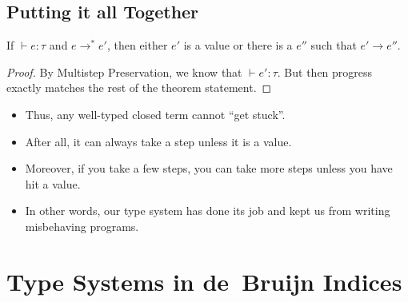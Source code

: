 \documentclass{lecturenotes}
\begin{document}
\subsection{Putting it all Together}
\label{sec:putting-it-all}

\begin{thm}
  If $\vdash e \colon \tau$ and $e \to^\ast e'$, then either $e'$ is a value or there is a $e''$ such that $e' \to e''$.
\end{thm}
\begin{proof}
  By Multistep Preservation, we know that $\vdash e' : \tau$.
  But then progress exactly matches the rest of the theorem statement.
\end{proof}

\begin{itemize}
\item Thus, any well-typed closed term cannot ``get stuck''.
\item After all, it can always take a step unless it is a value.
\item Moreover, if you take a few steps, you can take more steps unless you have hit a value.
\item In other words, our type system has done its job and kept us from writing misbehaving programs.
\end{itemize}

\section{Type Systems in de~Bruijn Indices}
\label{sec:type-systems-de}
\end{document}
